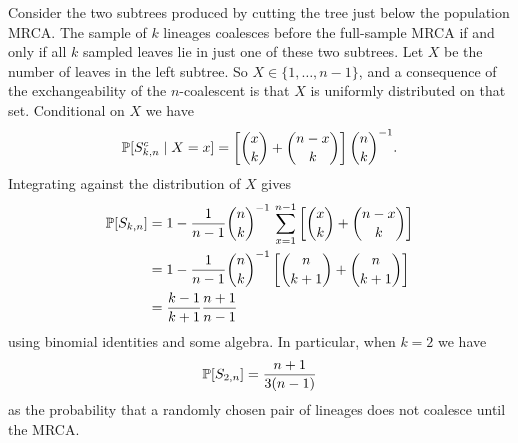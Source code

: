 Consider the two subtrees produced by cutting the tree just below the population MRCA. The sample of $k$ lineages coalesces before the full-sample MRCA if and only if all $k$ sampled leaves lie in just one of these two subtrees.
Let $X$ be the number of leaves in the left subtree. So $X \in \{1,\dots,n-1\} $, and a consequence of the exchangeability of the $n$-coalescent is that $X$ is uniformly distributed on that set.
Conditional on $X$ we have
\begin{equation*}
\mathbb{P} [S_{k,n}^c \mid X=x]
= \left[ \binom{x}{k} + \binom{n-x}{k} \right] \binom{n}{k}^{-1} .
\end{equation*}
Integrating against the distribution of $X$ gives
\begin{align*}
\mathbb{P}[ S_{k,n} ]
&= 1 - \frac{1}{n-1} \binom{n}{k}^{-1} \, \sum_{x=1}^{n-1} 
        \left[ \binom{x}{k} + \binom{n-x}{k} \right] \\
&= 1 - \frac{1}{n-1} \binom{n}{k}^{-1} 
        \left[ \binom{n}{k+1} + \binom{n}{k+1} \right] \\
&= \frac{k-1}{k+1} \frac{n+1}{n-1}
\end{align*}
using binomial identities and some algebra.
In particular, when $k=2$ we have
\begin{equation*}
\mathbb{P}[ S_{2,n} ]
=\frac{n+1}{3(n-1)} 
\end{equation*}
as the probability that a randomly chosen pair of lineages does not coalesce until the MRCA.
%
%



